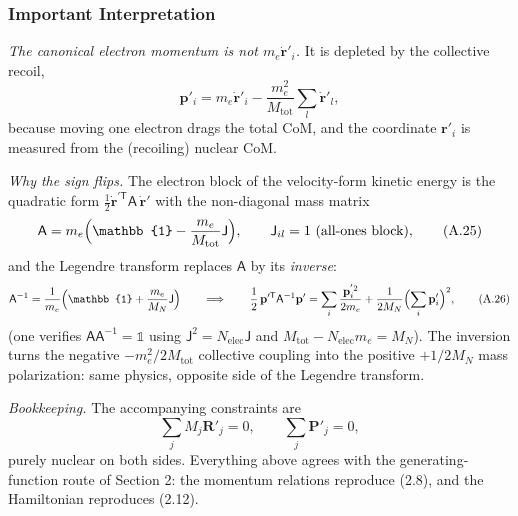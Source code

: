 \subsubsection*{Important Interpretation}

\noindent\emph{The canonical electron momentum is not $m_e\dot{\mathbf r}'_i$.} It is depleted by the collective recoil,
\begin{equation}
\mathbf p'_i = m_e\dot{\mathbf r}'_i - \frac{m_e^2}{M_{\mathrm{tot}}}\sum_l\dot{\mathbf r}'_l , \tag{A.24}
\end{equation}
because moving one electron drags the total CoM, and the coordinate $\mathbf r'_i$ is measured from the (recoiling) nuclear CoM.

\noindent\emph{Why the sign flips.} The electron block of the velocity-form kinetic energy is the quadratic form $\frac12\dot{\mathbf r}^{\prime\mathsf T}\mathsf A\,\dot{\mathbf r}'$ with the non-diagonal mass matrix
\begin{equation}
\mathsf A = m_e\Bigl(\mathbb{1} - \frac{m_e}{M_{\mathrm{tot}}}\mathsf J\Bigr),
\qquad \mathsf J_{il} = 1 \ \text{(all-ones block)}, \tag{A.25}
\end{equation}
and the Legendre transform replaces $\mathsf A$ by its \emph{inverse}:
\begin{equation}
\mathsf A^{-1} = \frac{1}{m_e}\Bigl(\mathbb{1} + \frac{m_e}{M_N}\mathsf J\Bigr)
\qquad\Longrightarrow\qquad
\frac12\,\mathbf p^{\prime\mathsf T}\mathsf A^{-1}\mathbf p'
= \sum_i\frac{\mathbf p_i^{'2}}{2m_e} + \frac{1}{2M_N}\Bigl(\sum_i\mathbf p'_i\Bigr)^2 , \tag{A.26}
\end{equation}
(one verifies $\mathsf A\mathsf A^{-1}=\mathbb{1}$ using $\mathsf J^2 = N_{\mathrm{elec}}\mathsf J$ and $M_{\mathrm{tot}} - N_{\mathrm{elec}}m_e = M_N$). The inversion turns the negative $-m_e^2/2M_{\mathrm{tot}}$ collective coupling into the positive $+1/2M_N$ mass polarization: same physics, opposite side of the Legendre transform.

\noindent\emph{Bookkeeping.} The accompanying constraints are
\begin{equation}
\boxed{\;
\sum_j M_j \mathbf R'_j = 0 ,
\qquad
\sum_j \mathbf P'_j = 0 ,
\;} \tag{A.27}
\end{equation}
purely nuclear on both sides. Everything above agrees with the generating-function route of Section 2: the momentum relations reproduce (2.8), and the Hamiltonian reproduces (2.12).
